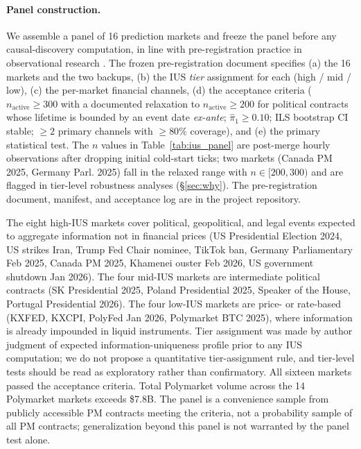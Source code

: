 \documentclass{article}
\begin{document}
\paragraph{Panel construction.}
We assemble a panel of 16 prediction markets and freeze the panel before any causal-discovery computation, in line with pre-registration practice in observational research \citep{nosek2018preregistration}. The frozen pre-registration document specifies (a) the 16 markets and the two backups, (b) the IUS \emph{tier} assignment for each (high / mid / low), (c) the per-market financial channels, (d) the acceptance criteria ($n_\text{active} \ge 300$ with a documented relaxation to $n_\text{active} \ge 200$ for political contracts whose lifetime is bounded by an event date \emph{ex-ante}; $\hat\pi_1 \ge 0.10$; ILS bootstrap CI stable; $\ge 2$ primary channels with $\ge 80\%$ coverage), and (e) the primary statistical test. The $n$ values in Table~\ref{tab:ius_panel} are post-merge hourly observations after dropping initial cold-start ticks; two markets (Canada PM 2025, Germany Parl. 2025) fall in the relaxed range with $n \in [200, 300)$ and are flagged in tier-level robustness analyses (\S\ref{sec:why}). The pre-registration document, manifest, and acceptance log are in the project repository.

The eight high-IUS markets cover political, geopolitical, and legal events expected to aggregate information not in financial prices (US Presidential Election 2024, US strikes Iran, Trump Fed Chair nominee, TikTok ban, Germany Parliamentary Feb 2025, Canada PM 2025, Khamenei ouster Feb 2026, US government shutdown Jan 2026). The four mid-IUS markets are intermediate political contracts (SK Presidential 2025, Poland Presidential 2025, Speaker of the House, Portugal Presidential 2026). The four low-IUS markets are price- or rate-based (KXFED, KXCPI, PolyFed Jan 2026, Polymarket BTC 2025), where information is already impounded in liquid instruments. Tier assignment was made by author judgment of expected information-uniqueness profile prior to any IUS computation; we do not propose a quantitative tier-assignment rule, and tier-level tests should be read as exploratory rather than confirmatory. All sixteen markets passed the acceptance criteria. Total Polymarket volume across the 14 Polymarket markets exceeds \$7.8B. The panel is a convenience sample from publicly accessible PM contracts meeting the criteria, not a probability sample of all PM contracts; generalization beyond this panel is not warranted by the panel test alone.
\end{document}
